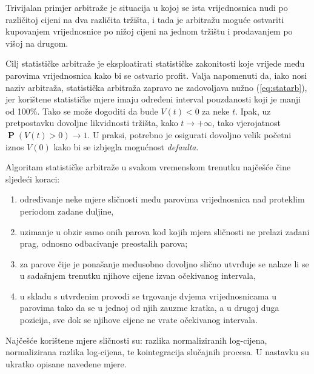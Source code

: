 \documentclass[lmodern, utf8, diplomski, numeric]{fer}
\newcommand{\prob}[1]{\operatorname{\mathbf{P}}\q(#1\w)}
\newcommand{\q}{\left}
\newcommand{\w}{\right}
\begin{document}
  Trivijalan primjer arbitraže je situacija u kojoj se ista vrijednosnica nudi po različitoj cijeni na dva različita tržišta, i tada je arbitražu moguće ostvariti kupovanjem vrijednosnice po nižoj cijeni na jednom tržištu i prodavanjem po višoj na drugom.
  
  Cilj statističke arbitraže je eksploatirati statističke zakonitosti koje vrijede među parovima vrijednosnica kako bi se ostvario profit.  
  Valja napomenuti da, iako nosi naziv arbitraža, statistička arbitraža zapravo ne zadovoljava nužno (\ref{eq:statarb}), jer korištene statističke mjere imaju određeni interval pouzdanosti koji je manji od 100\%.
  Tako se može dogoditi da bude $V\q(t\w) < 0$ za neke $t$.
  Ipak, uz pretpostavku dovoljne likvidnosti tržišta, kako $t \to +\infty$, tako vjerojatnost $\prob{V\q(t\w) > 0} \to 1$.
  U praksi, potrebno je osigurati dovoljno velik početni iznos $V(0)$ kako bi se izbjegla mogućnost \textit{defaulta}.
  
  Algoritam statističke arbitraže u svakom vremenskom trenutku najčešće čine sljedeći koraci:
  \begin{enumerate}
    \item određivanje neke mjere sličnosti među parovima vrijednosnica nad proteklim periodom zadane duljine,
    \item uzimanje u obzir samo onih parova kod kojih mjera sličnosti ne prelazi zadani prag, odnosno odbacivanje preostalih parova;
    \item za parove čije je ponašanje međusobno dovoljno slično utvrđuje se nalaze li se u sadašnjem trenutku njihove cijene izvan očekivanog intervala,
    \item u skladu s utvrđenim provodi se trgovanje dvjema vrijednosnicama u parovima tako da se u jednoj od njih zauzme kratka, a u drugoj duga pozicija, sve dok se njihove cijene ne vrate očekivanog intervala.
  \end{enumerate}
  
  Najčešće korištene mjere sličnosti su: razlika normaliziranih log-cijena, normalizirana razlika log-cijena, te kointegracija slučajnih procesa.
  U nastavku su ukratko opisane navedene mjere.
  
\end{document}
